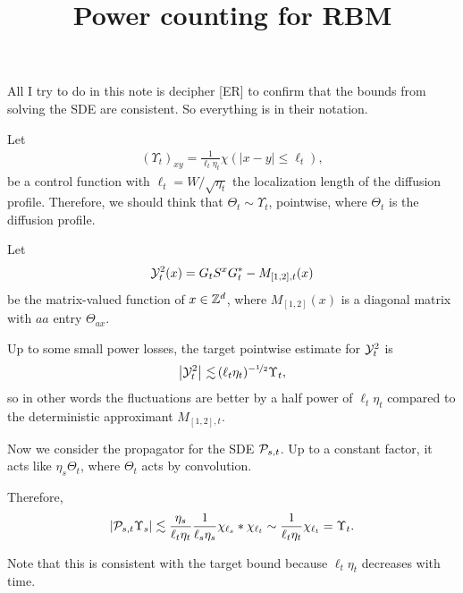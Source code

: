 \documentclass[11pt]{amsart}
\title{Power counting for RBM}
\begin{document}
\maketitle

All I try to do in this note is decipher [ER] to confirm that the bounds from solving the SDE are consistent.
So everything is in their notation.

Let 
\begin{align*}
(\Upsilon_t)_{xy} = \frac{1}{\ell_t \eta_t} \chi(|x-y| \leq \ell_t),
\end{align*}
be a control function with $\ell_t = W/\sqrt{\eta_t} $ the localization length of the diffusion profile. Therefore, we should think that $\Theta_t \sim \Upsilon_t$, pointwise, where $\Theta_t$ is the diffusion profile.

Let
\begin{align*}
\mathcal{Y}_t^{2}(x) = G_t S^{x} G_t^{*} - M_{[1,2],t}(x)
\end{align*}
be the matrix-valued function of $x \in  {\mathbb{Z}}^{d}$, where $M_{[1,2]}(x)$ is a diagonal matrix with $aa$ entry $\Theta_{ax}$.

Up to some small power losses, the target pointwise estimate for $\mathcal{Y}^{2}_t$ is
\begin{align*}
\left| \mathcal{Y}^{2}_t \right| {\,\lesssim\,} (\ell_t \eta_t)^{-\nicefrac 12} \Upsilon_{t},
\end{align*}
so in other words the fluctuations are better by a half power of $\ell_t \eta_t$ compared to the deterministic approximant $M_{[1,2],t}$.

Now we consider the propagator for the SDE $\mathcal{P}_{s,t}$. Up to a constant factor, it acts like $\eta_s \Theta_t$, where $\Theta_t$ acts by convolution.

Therefore,
\begin{align*}
|\mathcal{P}_{s,t} \Upsilon_s| \lesssim \frac{\eta_s}{\ell_t \eta_t} \frac{1}{\ell_s \eta_s} \chi_{\ell_s} * \chi_{\ell_t} \sim \frac{1}{\ell_t \eta_t} \chi_{\ell_t} = \Upsilon_{t}.
\end{align*}

Note that this is consistent with the target bound because $\ell_t \eta_t$ decreases with time.
\end{document}
